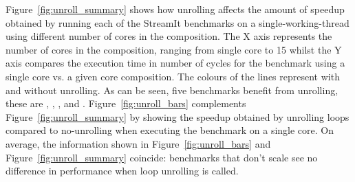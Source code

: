 Figure~\ref{fig:unroll_summary} shows how unrolling affects the amount of speedup obtained by running each of the StreamIt benchmarks on a single-working-thread using different number of cores in the composition.
The X axis represents the number of cores in the composition, ranging from single core to 15 whilst the Y axis compares the execution time in number of cycles for the benchmark using a single core vs. a given core composition.
The colours of the lines represent with and without unrolling.
As can be seen, five benchmarks benefit from unrolling, these are , , ,  and . 
Figure~\ref{fig:unroll_bars} complements Figure~\ref{fig:unroll_summary} by showing the speedup obtained by unrolling loops compared to no-unrolling when executing the benchmark on a single core.
On average, the information shown in Figure~\ref{fig:unroll_bars} and Figure~\ref{fig:unroll_summary} coincide: benchmarks that don't scale see no difference in performance when loop unrolling is called.


